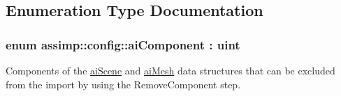 \subsection{Enumeration Type Documentation}
\hypertarget{namespaceassimp_1_1config_ad1b64b8f67159b86655b820ed6f75e62}{
\subsubsection[{ai\+Component}]{\setlength{\rightskip}{0pt plus 5cm}enum assimp\+::config\+::ai\+Component \+: uint}}\label{namespaceassimp_1_1config_ad1b64b8f67159b86655b820ed6f75e62}
Components of the {\ttfamily \hyperlink{structai_scene}{ai\+Scene}} and {\ttfamily \hyperlink{structai_mesh}{ai\+Mesh}} data structures that can be excluded from the import by using the {\ttfamily Remove\+Component} step.

